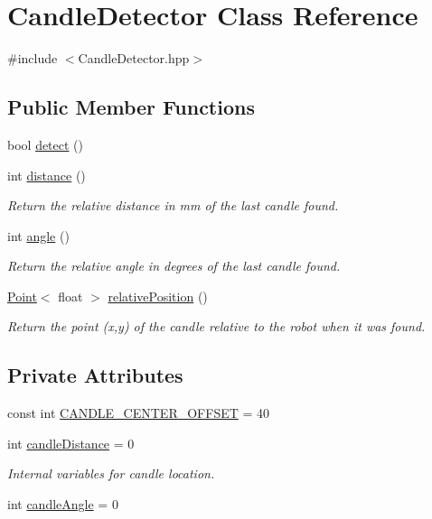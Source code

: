 \hypertarget{classCandleDetector}{\section{Candle\-Detector Class Reference}
\label{classCandleDetector}
}


{\ttfamily \#include $<$Candle\-Detector.\-hpp$>$}

\subsection*{Public Member Functions}
\begin{DoxyCompactItemize}
\item 
bool \hyperlink{classCandleDetector_a8b9d654f3be7f3ae44d4e1fc07d08b51}{detect} ()
\item 
int \hyperlink{classCandleDetector_a01619df190ca44d8171055b49e81444f}{distance} ()
\begin{DoxyCompactList}\small\item\em Return the relative distance in mm of the last candle found. \end{DoxyCompactList}\item 
int \hyperlink{classCandleDetector_a69d5ea11e04eaa51214c3a786eec7455}{angle} ()
\begin{DoxyCompactList}\small\item\em Return the relative angle in degrees of the last candle found. \end{DoxyCompactList}\item 
\hyperlink{classPoint}{Point}$<$ float $>$ \hyperlink{classCandleDetector_a773abb6491519a0d1b7111e2973c7199}{relative\-Position} ()
\begin{DoxyCompactList}\small\item\em Return the point (x,y) of the candle relative to the robot when it was found. \end{DoxyCompactList}\end{DoxyCompactItemize}
\subsection*{Private Attributes}
\begin{DoxyCompactItemize}
\item 
const int \hyperlink{classCandleDetector_a9920f067f44f9dc8aab6747699a244f7}{C\-A\-N\-D\-L\-E\-\_\-\-C\-E\-N\-T\-E\-R\-\_\-\-O\-F\-F\-S\-E\-T} = 40
\item 
int \hyperlink{classCandleDetector_a3d4f2c951c77838bfc5c068b58cf9fda}{candle\-Distance} = 0
\begin{DoxyCompactList}\small\item\em Internal variables for candle location. \end{DoxyCompactList}\item 
int \hyperlink{classCandleDetector_a043c3f35890b36e187734a492f96f84c}{candle\-Angle} = 0
\end{DoxyCompactItemize}
